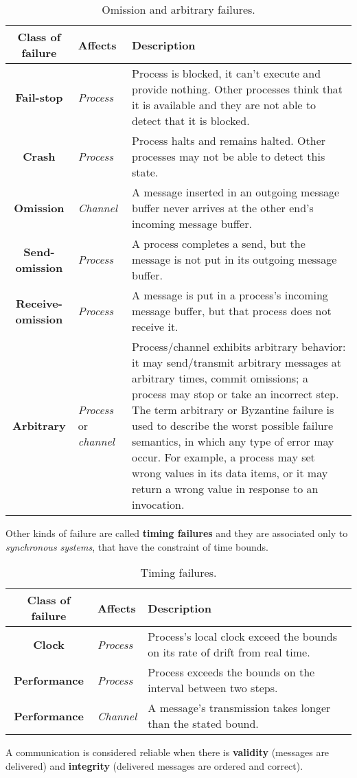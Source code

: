 \documentclass[11pt,a4paper]{article}
\begin{document}
\begin{table}[H]
	\centering
	\begin{tabular}{| c | p{1.7cm} | p{9.5cm} |}
		\hline
		\textbf{Class of failure} & \textbf{Affects} & \textbf{Description} \\ \hline
		\textbf{Fail-stop} & \textit{Process} & Process is blocked, it can't execute and provide nothing. Other processes think that it is available and they are not able to detect that it is blocked. \\
		\hline
		\textbf{Crash} & \textit{Process} & Process halts and remains halted. Other processes may not be able to detect this state. \\
		\hline
		\textbf{Omission} & \textit{Channel} & A message inserted in an outgoing message buffer never arrives at the other end's incoming message buffer.\\
		\hline
		\textbf{Send-omission} & \textit{Process} & A process completes a send, but the message is not put in its outgoing message buffer. \\
		\hline
		\textbf{Receive-omission} & \textit{Process} & A message is put in a process's incoming message buffer, but that process does not receive it.\\
		\hline
		\textbf{Arbitrary} & \textit{Process} or \textit{channel} & Process/channel exhibits arbitrary behavior: it may send/transmit arbitrary messages at arbitrary times, commit omissions; a process may stop or take an incorrect step. The term arbitrary or Byzantine failure is used to describe the worst possible failure semantics, in which any type of error may occur. For example, a process may set wrong values in its data items, or it may return a wrong value in response to an invocation.\\
		\hline
	\end{tabular}
	\caption{Omission and arbitrary failures.}
\end{table}
\par
Other kinds of failure are called \textbf{timing failures} and they are associated only to \textit{synchronous systems}, that have the constraint of time bounds.
\begin{table}[H]
	\centering
	\begin{tabular}{| c | p{1.7cm} | p{9.5cm} |}
		\hline
		\textbf{Class of failure} & \textbf{Affects} & \textbf{Description} \\ \hline
		\textbf{Clock} & \textit{Process} & Process's local clock exceed the bounds on its rate of drift from real time. \\
		\hline
		\textbf{Performance} & \textit{Process} & Process exceeds the bounds on the interval between two steps.\\
		\hline
		\textbf{Performance} & \textit{Channel} & A message's transmission takes longer than the stated bound.\\
		\hline
	\end{tabular}
	\caption{Timing failures.}
\end{table}
\par
A communication is considered reliable when there is \textbf{validity} (messages are delivered) and \textbf{integrity} (delivered messages are ordered and correct).
\end{document}
